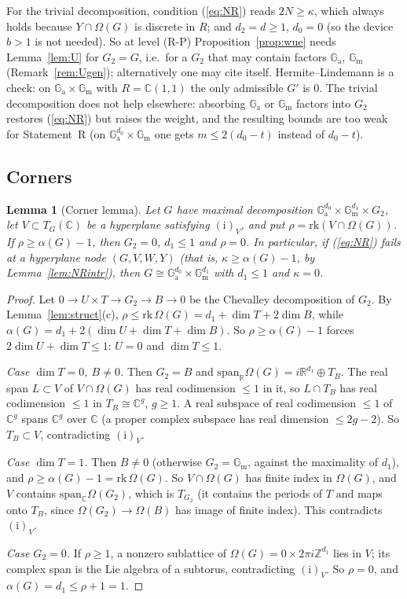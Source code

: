 \documentclass[11pt]{amsart}
\newtheorem{lemma}[theorem]{Lemma}
\theoremstyle{definition}
\newcommand{\C}{\mathbb{C}}
\newcommand{\Z}{\mathbb{Z}}
\newcommand{\R}{\mathbb{R}}
\newcommand{\Ga}{\mathbb{G}_{\mathrm a}}
\newcommand{\Gm}{\mathbb{G}_{\mathrm m}}
\begin{document}
\noindent For the trivial decomposition, condition (\ref{eq:NR}) reads $2N\ge\kappa$, which always holds because
$Y\cap\Omega(G)$ is discrete in $R$; and $d_2=d\ge1$, $d_0=0$ (so the device $b>1$ is not needed). So at level (R-P)
Proposition~\ref{prop:wue} needs Lemma~\ref{lem:U} for $G_2=G$, i.e.\ for a $G_2$ that may contain factors $\Ga$, $\Gm$
(Remark~\ref{rem:Ugen}); alternatively one may cite \cite{Wu89} itself. Hermite--Lindemann is a check: on $\Ga\times\Gm$ with
$R=\C(1,1)$ the only admissible $G'$ is $0$. The trivial decomposition does not help elsewhere: absorbing $\Ga$ or $\Gm$
factors into $G_2$ restores (\ref{eq:NR}) but raises the weight, and the resulting bounds are too weak for
Statement~R (on $\Ga^{d_0}\times\Gm$ one gets $m\le2(d_0-t)$ instead of $d_0-t$).

\subsection{Corners}\label{sec:corner}

\begin{lemma}[Corner lemma]\label{lem:corner}
Let $G$ have maximal decomposition $\Ga^{d_0}\times\Gm^{d_1}\times G_2$, let $V\subset T_G(\C)$ be a hyperplane satisfying
$(\mathrm i)_V$, and put $\rho=\mathrm{rk}(V\cap\Omega(G))$. If $\rho\ge\alpha(G)-1$, then $G_2=0$, $d_1\le1$ and $\rho=0$.
In particular, if (\ref{eq:NR}) fails at a hyperplane node $(G,V,W,Y)$ (that is, $\kappa\ge\alpha(G)-1$, by
Lemma~\ref{lem:NRintr}), then $G\cong\Ga^{d_0}\times\Gm^{d_1}$ with $d_1\le1$ and $\kappa=0$.
\end{lemma}

\begin{proof}
Let $0\to U\times T\to G_2\to B\to0$ be the Chevalley decomposition of $G_2$. By Lemma~\ref{lem:struct}(c),
$\rho\le\mathrm{rk}\,\Omega(G)=d_1+\dim T+2\dim B$, while $\alpha(G)=d_1+2(\dim U+\dim T+\dim B)$. So $\rho\ge\alpha(G)-1$
forces $2\dim U+\dim T\le1$: $U=0$ and $\dim T\le1$.

\emph{Case $\dim T=0$, $B\ne0$.} Then $G_2=B$ and $\mathrm{span}_\R\Omega(G)=i\R^{d_1}\oplus T_B$. The real span $L\subset V$ of
$V\cap\Omega(G)$ has real codimension $\le1$ in it, so $L\cap T_B$ has real codimension $\le1$ in $T_B\cong\C^g$, $g\ge1$. A
real subspace of real codimension $\le1$ of $\C^g$ spans $\C^g$ over $\C$ (a proper complex subspace has real dimension
$\le2g-2$). So $T_B\subset V$, contradicting $(\mathrm i)_V$.

\emph{Case $\dim T=1$.} Then $B\ne0$ (otherwise $G_2=\Gm$, against the maximality of $d_1$), and $\rho\ge\alpha(G)-1=
\mathrm{rk}\,\Omega(G)$. So $V\cap\Omega(G)$ has finite index in $\Omega(G)$, and $V$ contains $\mathrm{span}_\C\Omega(G_2)$,
which is $T_{G_2}$ (it contains the periods of $T$ and maps onto $T_B$, since $\Omega(G_2)\to\Omega(B)$ has image of finite
index). This contradicts $(\mathrm i)_V$.

\emph{Case $G_2=0$.} If $\rho\ge1$, a nonzero sublattice of $\Omega(G)=0\times2\pi i\Z^{d_1}$ lies in $V$; its complex span is
the Lie algebra of a subtorus, contradicting $(\mathrm i)_V$. So $\rho=0$, and $\alpha(G)=d_1\le\rho+1=1$.
\end{proof}
\end{document}
